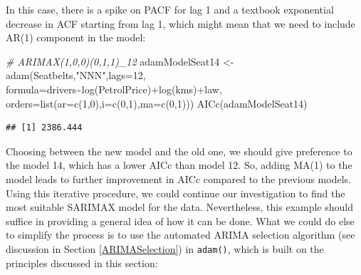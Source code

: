 \documentclass[
]{book}
\newenvironment{Shaded}{\begin{snugshade}}{\end{snugshade}}
\newcommand{\AttributeTok}[1]{\textcolor[rgb]{0.77,0.63,0.00}{#1}}
\newcommand{\CommentTok}[1]{\textcolor[rgb]{0.56,0.35,0.01}{\textit{#1}}}
\newcommand{\ConstantTok}[1]{\textcolor[rgb]{0.00,0.00,0.00}{#1}}
\newcommand{\DecValTok}[1]{\textcolor[rgb]{0.00,0.00,0.81}{#1}}
\newcommand{\FunctionTok}[1]{\textcolor[rgb]{0.00,0.00,0.00}{#1}}
\newcommand{\NormalTok}[1]{#1}
\newcommand{\OtherTok}[1]{\textcolor[rgb]{0.56,0.35,0.01}{#1}}
\newcommand{\SpecialCharTok}[1]{\textcolor[rgb]{0.00,0.00,0.00}{#1}}
\newcommand{\StringTok}[1]{\textcolor[rgb]{0.31,0.60,0.02}{#1}}
\theoremstyle{definition}
\theoremstyle{definition}
\theoremstyle{definition}
\theoremstyle{definition}
\theoremstyle{remark}
\begin{document}
In this case, there is a spike on PACF for lag 1 and a textbook exponential decrease in ACF starting from lag 1, which might mean that we need to include AR(1) component in the model:

\begin{Shaded}
\begin{Highlighting}[]
\CommentTok{\# ARIMAX(1,0,0)(0,1,1)\_12}
\NormalTok{adamModelSeat14 }\OtherTok{\textless{}{-}} \FunctionTok{adam}\NormalTok{(Seatbelts,}\StringTok{"NNN"}\NormalTok{,}\AttributeTok{lags=}\DecValTok{12}\NormalTok{,}
                        \AttributeTok{formula=}\NormalTok{drivers}\SpecialCharTok{\textasciitilde{}}\FunctionTok{log}\NormalTok{(PetrolPrice)}\SpecialCharTok{+}\FunctionTok{log}\NormalTok{(kms)}\SpecialCharTok{+}\NormalTok{law,}
                        \AttributeTok{orders=}\FunctionTok{list}\NormalTok{(}\AttributeTok{ar=}\FunctionTok{c}\NormalTok{(}\DecValTok{1}\NormalTok{,}\DecValTok{0}\NormalTok{),}\AttributeTok{i=}\FunctionTok{c}\NormalTok{(}\DecValTok{0}\NormalTok{,}\DecValTok{1}\NormalTok{),}\AttributeTok{ma=}\FunctionTok{c}\NormalTok{(}\DecValTok{0}\NormalTok{,}\DecValTok{1}\NormalTok{)))}
\FunctionTok{AICc}\NormalTok{(adamModelSeat14)}
\end{Highlighting}
\end{Shaded}

\begin{verbatim}
## [1] 2386.444
\end{verbatim}

Choosing between the new model and the old one, we should give preference to the model 14, which has a lower AICc than model 12. So, adding MA(1) to the model leads to further improvement in AICc compared to the previous models. Using this iterative procedure, we could continue our investigation to find the most suitable SARIMAX model for the data. Nevertheless, this example should suffice in providing a general idea of how it can be done. What we could do else to simplify the process is to use the automated ARIMA selection algorithm (see discussion in Section \ref{ARIMASelection}) in \texttt{adam()}, which is built on the principles discussed in this section:

\begin{Shaded}
\end{Shaded}
\end{document}
